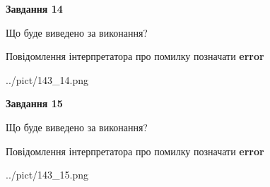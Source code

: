 \documentclass[11pt, ukrainian]{article}
\begin{document}
{\begin {large}
{\begin {center}\textbf{Завдання 14}\end {center}}\par
Що буде виведено за виконання? \par
Повідомлення інтерпретатора про помилку позначати \textbf{error}

\begin{center}
	{../pict/143_14.png}
\end{center}
\newpage

{\begin {center}\textbf{Завдання 15}\end {center}}\par
Що буде виведено за виконання? \par
Повідомлення інтерпретатора про помилку позначати \textbf{error}

\begin{center}
	{../pict/143_15.png}
\end{center}
\newpage

\end {large}}
\end{document}
